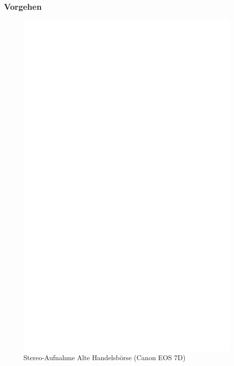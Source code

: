 \documentclass[liststotoc,bibtotoc,fontsize=14pt,]{scrreprt}
\begin{document}
	\subsubsection{Vorgehen}


	 \newpage
	 \begin{figure}[h]
		 	\includegraphics[width=\linewidth]{img/ph.jpg}
		 	\caption{Stereo-Aufnahme Alte Handelsbörse (Canon EOS 7D)}
	 \end{figure}
	 
\end{document}
